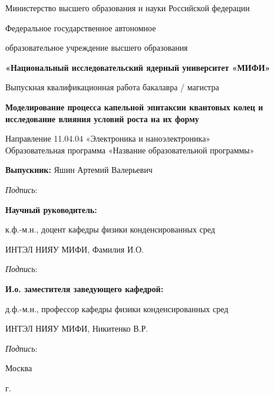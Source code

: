 \begin{titlepage}
\begin{center}
{Министерство высшего образования и науки Российской федерации}

{Федеральное государственное автономное}

{образовательное учреждение высшего образования}

{\textbf{«Национальный исследовательский ядерный университет «МИФИ»}}

\vspace{20mm}

Выпускная квалификационная работа бакалавра / магистра

\textbf{\large Моделирование процесса капельной эпитаксии квантовых колец и исследование влияния условий роста на их форму}

\vspace{10mm}
Направление 11.04.04 «Электроника и наноэлектроника»\\
Образовательная программа
«Название образовательной программы»

\vspace{10mm}

\begin{flushleft}
\textbf{Выпускник:} Яшин Артемий Валерьевич

\hspace{10cm} \textit{Подпись}: \space \hrulefill

\textbf{Научный руководитель:} 

к.ф.-м.н., доцент кафедры физики конденсированных сред

ИНТЭЛ НИЯУ МИФИ, Фамилия И.О.

\hspace{10cm} \textit{Подпись}: \space \hrulefill

\textbf{И.о. заместителя заведующего кафедрой:} 

д.ф.-м.н., профессор кафедры физики конденсированных сред 

ИНТЭЛ НИЯУ МИФИ, Никитенко В.Р.

\hspace{10cm} \textit{Подпись}: \space \hrulefill \space
\end{flushleft}

\vfill

{Москва}
\par{\the\year{} г.}
\end{center}
\end{titlepage}